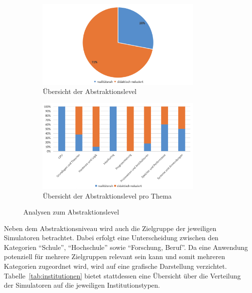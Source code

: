 \begin{figure}[!htbp]
    \centering
    \begin{subfigure}[b]{0.48\textwidth}
        \centering
        \includegraphics[width=0.90\textwidth]{graphics_sim/5-abstraktion.png}
        \caption{Übersicht der Abstraktionslevel}
        \label{fig:5-abstraktion}
    \end{subfigure}
    \hfill
    \begin{subfigure}[b]{0.48\textwidth}
        \centering
        \includegraphics[width=0.90\textwidth]{graphics_sim/6-abstraktion-thema.png}
        \caption{Übersicht der Abstraktionslevel pro Thema}
        \label{fig:6-abstraktion-thema}
    \end{subfigure}
    \caption{Analysen zum Abstraktionslevel}
    \label{fig:abstraktion-gesamt}
\end{figure}

Neben dem Abstraktionsniveau wird auch die Zielgruppe der jeweiligen Simulatoren betrachtet. Dabei erfolgt eine Unterscheidung zwischen den Kategorien \enquote{Schule}, \enquote{Hochschule} sowie \enquote{Forschung, Beruf}. Da eine Anwendung potenziell für mehrere Zielgruppen relevant sein kann und somit mehreren Kategorien zugeordnet wird, wird auf eine grafische Darstellung verzichtet. Tabelle~\ref{tab:institutionen} bietet stattdessen eine Übersicht über die Verteilung der Simulatoren auf die jeweiligen Institutionstypen.


